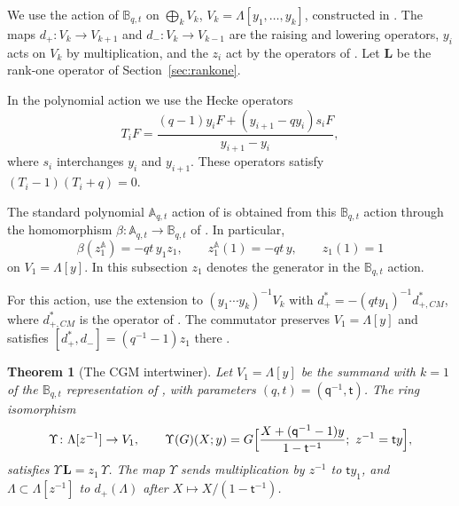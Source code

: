 \documentclass[11pt]{amsart}
\newtheorem{theorem}{Theorem}[section]
\theoremstyle{definition}
\theoremstyle{remark}
\newcommand{\Mq}{\mathsf q}                      %
\newcommand{\Mt}{\mathsf t}                      %
\newcommand{\La}{\Lambda}                        %
\newcommand{\Vone}{V_1}                          %
\newcommand{\zz}[1]{z_{#1}}
\newcommand{\yy}[1]{y_{#1}}
\newcommand{\zone}{\zz{1}}
\newcommand{\yone}{\yy{1}}
\newcommand{\dplus}{d_+}
\newcommand{\dminus}{d_-}
\newcommand{\LL}{\mathbf L}
\newcommand{\Plethmap}{\Upsilon}                 %
\begin{document}
We use the action of \(\mathbb B_{q,t}\) on
\(\bigoplus_kV_k\), \(V_k=\La[y_1,\dots,y_k]\), constructed in
\cite[Theorem~3.4.2(2)]{CGM}. The maps \(\dplus\colon
V_k\to V_{k+1}\) and \(\dminus\colon V_k\to V_{k-1}\) are the raising and
lowering operators, \(\yy{i}\) acts on \(V_k\) by multiplication, and the
\(\zz{i}\) act by the operators of \cite{CGM}. Let \(\LL\) be the rank-one operator of
Section~\ref{sec:rankone}.

In the polynomial action we use the Hecke operators
\[
 T_iF=\frac{(q-1)y_iF+(y_{i+1}-qy_i)s_iF}{y_{i+1}-y_i},
\]
where \(s_i\) interchanges \(y_i\) and \(y_{i+1}\). These operators satisfy
\((T_i-1)(T_i+q)=0\).

The standard polynomial \(\mathbb A_{q,t}\) action of \cite[Proposition~3.4.1]{CGM} is obtained
from this \(\mathbb B_{q,t}\) action through the homomorphism
\(\beta\colon\mathbb A_{q,t}\to\mathbb B_{q,t}\) of \cite[Section~3.2]{CGM}. In particular,
\[
 \beta(\zone^{\mathbb A})=-qt\,\yone\zone,\qquad
 \zone^{\mathbb A}(1)=-qt\,y,\qquad \zone(1)=1
\]
on \(V_1=\La[y]\). In this subsection \(\zone\) denotes the generator in the
\(\mathbb B_{q,t}\) action.

For this action, use the extension to \((y_1\cdots y_k)^{-1}V_k\) with
\(d_+^*=-(qty_1)^{-1}d_{+,CM}^*\), where \(d_{+,CM}^*\) is the operator of
\cite[Proposition~3.4.1]{CGM}. The commutator preserves \(V_1=\La[y]\) and satisfies
\([d_+^*,\dminus]=(q^{-1}-1)\zone\) there
\cite[proof of Proposition~3.2.6]{CGM}.
\begin{theorem}[The CGM intertwiner]\label{thm:rankone}
Let \(\Vone=\La[y]\) be the summand with \(k=1\) of the \(\mathbb B_{q,t}\) representation of
\cite[Theorem~3.4.2(2)]{CGM}, with parameters \((q,t)=(\Mq^{-1},\Mt)\). The ring isomorphism
\[
 \Plethmap\colon\La[z^{-1}]\to\Vone,\qquad
 \Plethmap(G)(X;y)=G\Bigl[\frac{X+(\Mq^{-1}-1)y}{1-\Mt^{-1}};\ z^{-1}=\Mt y\Bigr],
\]
satisfies \(\Plethmap\,\LL=\zone\,\Plethmap\). The map \(\Plethmap\) sends multiplication by
\(z^{-1}\) to \(\Mt\yone\), and \(\La\subset\La[z^{-1}]\) to \(\dplus(\La)\)
after \(X\mapsto X/(1-\Mt^{-1})\).
\end{theorem}
\end{document}
